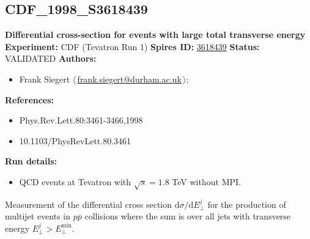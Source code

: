 \subsection[CDF\_1998\_S3618439]{CDF\_1998\_S3618439\,\cite{Abe:1997eua}}
\textbf{Differential cross-section for events with large total transverse energy}\newline
\textbf{Experiment:} CDF (Tevatron Run 1) \newline
\textbf{Spires ID:} \href{http://www.slac.stanford.edu/spires/find/hep/www?rawcmd=key+3618439}{3618439}\newline
\textbf{Status:} VALIDATED\newline
\textbf{Authors:}
\begin{itemize}
  \item Frank Siegert $\langle\,$\href{mailto:frank.siegert@durham.ac.uk}{frank.siegert@durham.ac.uk}$\,\rangle$;
\end{itemize}
\textbf{References:}
\begin{itemize}
  \item Phys.Rev.Lett.80:3461-3466,1998
  \item 10.1103/PhysRevLett.80.3461
\end{itemize}
\textbf{Run details:}
\begin{itemize}

  \item QCD events at Tevatron with $\sqrt{s}=1.8$ TeV without MPI.\end{itemize}

\noindent Measurement of the differential cross section  $\mathrm{d}\sigma/\mathrm{d}E_\perp^j$ for the production of multijet events in $p\bar{p}$ collisions where the  sum is over all jets with transverse energy  $E_\perp^j > E_\perp^\mathrm{min}$.

\clearpage


\clearpage

